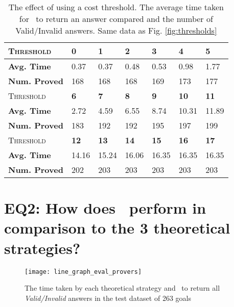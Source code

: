\begin{table}
	\caption[The effect of using a cost threshold]{The effect of using a cost threshold. The average time taken for \where~to return an answer compared and the number of Valid/Invalid answers. Same data as Fig. \ref{fig:thresholds}}
	\begin{tabularx}{0.9\textwidth}{@{}l|Z|Z|Z|Z|Z|Z@{}}

		\textsc{Threshold} & \textbf{0} & \textbf{1} & \textbf{2} & \textbf{3} & \textbf{4} & \textbf{5} \\
		\midrule
		\textbf{Avg. Time} & 0.37 & 0.37 & 0.48 & 0.53 & 0.98 & 1.77  \\
		\textbf{Num. Proved} & 168 & 168 & 168 & 169 & 173 & 177  \\
		\midrule
		\midrule
		\textsc{Threshold}  & \textbf{6} & \textbf{7} & \textbf{8} & \textbf{9} & \textbf{10} & \textbf{11}  \\
		\midrule
		\textbf{Avg. Time} & 2.72 & 4.59 & 6.55 & 8.74 & 10.31 & 11.89  \\
		\textbf{Num. Proved} & 183 & 192 & 192 & 195 & 197 & 199 \\
		\midrule
		\midrule
		\textsc{Threshold} & \textbf{12} & \textbf{13} & \textbf{14} & \textbf{15} & \textbf{16} & \textbf{17} \\
		\midrule
		\textbf{Avg. Time} & 14.16 & 15.24 & 16.06 & 16.35 & 16.35 & 16.35 \\
		\textbf{Num. Proved}  & 202 & 203 & 203 & 203 & 203 & 203 \\
		
	\end{tabularx}
	\label{table:threshold}
\end{table}



\section{EQ2: How does \where~perform in comparison to the 3 theoretical strategies?}

\begin{figure}
	\centering
	\texttt{[image: line\_graph\_eval\_provers]}
	\caption{The time taken by each theoretical strategy and \where~to return all \textit{Valid/Invalid} answers in the test dataset of 263 goals}
	\label{fig:line_graph_eval_provers}
\end{figure}


